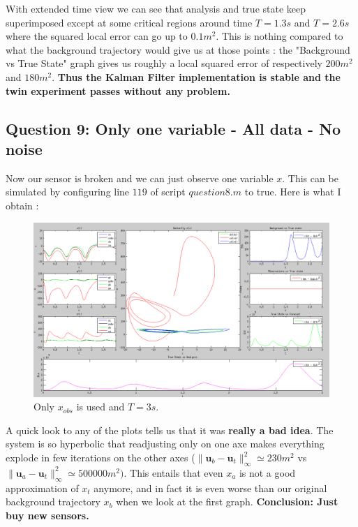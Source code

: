 \documentclass[11pt,a4paper]{article}
\renewcommand{\norm}[1]{\lVert #1 \rVert}
\renewcommand{\u} {\mathbf{u}}
\begin{document}
With extended time view we can see that analysis and true state keep superimposed except at some critical regions around time $T = 1.3s$ and $T = 2.6s$ where the squared local error can go up to $0.1m^2$. This is nothing compared to what the background trajectory would give us at those points :  the "Background vs True State" graph gives us roughly a local squared error of respectively $200m^2$ and $180m^2$. \textbf{Thus the Kalman Filter implementation is stable and the twin experiment passes without any problem.}

\clearpage
\subsection{Question 9: Only one variable - All data - No noise}

\vskip 0.5cm

Now our sensor is broken and we can just observe one variable $x$. This can be simulated by configuring line $119$ of script $question8.m$ to true.
Here is what I obtain :

\vskip 0.5cm

\begin{figure}[H]
   \includegraphics[width=16cm]{Q9.png}
   \caption{Only $x_{obs}$ is used and $T = 3s$.}
\end{figure}

\vskip 0.5cm

A quick look to any of the plots tells us that it was \textbf{really a bad idea}. The system is so hyperbolic that readjusting only on one axe makes everything explode in few iterations on the other axes ($\norm{\u_b - \u_t}_{\infty}^2 \simeq 230 m^2$ vs $\norm{\u_a - \u_t}_{\infty}^2 \simeq 500000 m^2)$. This entails that even $x_a$ is not a good approximation of $x_t$ anymore, and in fact it is even worse than our original background trajectory $x_b$ when we look at the first graph. \textbf{Conclusion: Just buy new sensors.}
\end{document}
